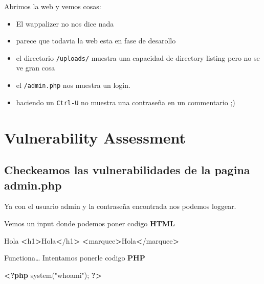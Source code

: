 \documentclass{assets/ipesethesis}
\newenvironment{Shaded}{\begin{snugshade}}{\end{snugshade}}
\newcommand{\ExtensionTok}[1]{#1}
\newcommand{\FunctionTok}[1]{\textcolor[rgb]{0.00,0.00,0.00}{#1}}
\newcommand{\KeywordTok}[1]{\textcolor[rgb]{0.13,0.29,0.53}{\textbf{#1}}}
\newcommand{\NormalTok}[1]{#1}
\newcommand{\OperatorTok}[1]{\textcolor[rgb]{0.81,0.36,0.00}{\textbf{#1}}}
\newcommand{\OtherTok}[1]{\textcolor[rgb]{0.56,0.35,0.01}{#1}}
\newcommand{\StringTok}[1]{\textcolor[rgb]{0.31,0.60,0.02}{#1}}
\providecommand{\tightlist}{%
  \setlength{\itemsep}{0pt}\setlength{\parskip}{0pt}}
\begin{document}
Abrimos la web y vemos cosas:

\begin{itemize}
\tightlist
\item
  El wappalizer no nos dice nada
\item
  parece que todavia la web esta en fase de desarollo
\item
  el directorio \texttt{/uploads/} muestra una capacidad de directory listing pero no se ve gran cosa
\item
  el \texttt{/admin.php} nos muestra un login.
\item
  haciendo un \texttt{Ctrl-U} no muestra una contraseña en un commentario ;)
\end{itemize}

\hypertarget{vulnerability-assessment-5}{%
\section*{Vulnerability Assessment}\label{vulnerability-assessment-5}}

\hypertarget{checkeamos-las-vulnerabilidades-de-la-pagina-admin.php}{%
\subsection*{Checkeamos las vulnerabilidades de la pagina admin.php}\label{checkeamos-las-vulnerabilidades-de-la-pagina-admin.php}}

Ya con el usuario admin y la contraseña encontrada nos podemos loggear.

Vemos un input donde podemos poner codigo \textbf{HTML}

\begin{Shaded}
\begin{Highlighting}[]
\ExtensionTok{Hola}
\OperatorTok{<}\ExtensionTok{h1}\OperatorTok{>}\NormalTok{Hola}\OperatorTok{<}\NormalTok{/h1}\OperatorTok{>}
\OperatorTok{<}\ExtensionTok{marquee}\OperatorTok{>}\NormalTok{Hola}\OperatorTok{<}\NormalTok{/marquee}\OperatorTok{>}
\end{Highlighting}
\end{Shaded}

Functiona\ldots{} Intentamos ponerle codigo \textbf{PHP}

\begin{Shaded}
\begin{Highlighting}[]
\KeywordTok{<?php} \FunctionTok{system}\OtherTok{(}\StringTok{"whoami"}\OtherTok{);} \KeywordTok{?>}
\end{Highlighting}
\end{Shaded}
\end{document}
